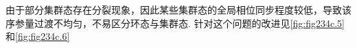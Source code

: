 \documentclass{article}
\begin{document}
\vspace{-0.5cm}
由于部分集群态存在分裂现象，因此某些集群态的全局相位同步程度较低，导致该序参量过渡不均匀，不易区分环态与集群态. 针对这个问题的改进见\ref{fig:fig234c.5}和\ref{fig:fig234c.6}










\end{document}
